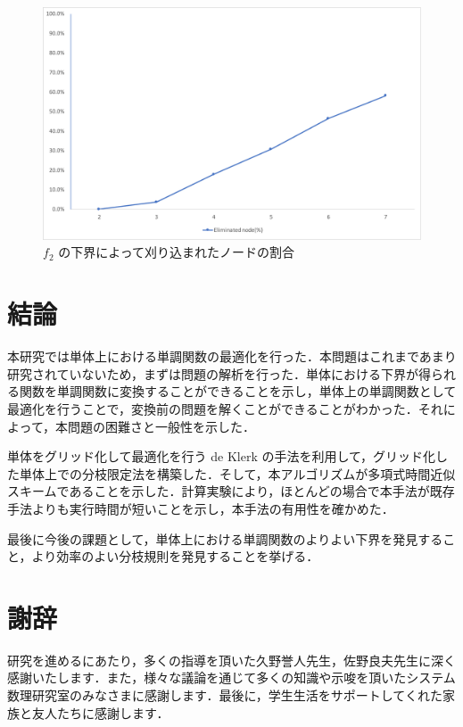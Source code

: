 \documentclass[a4paper,11pt]{jreport}
\begin{document}
\begin{figure}[h]
\begin{center}
\includegraphics[width=13.5cm]{graphs/f_2_eliminated.pdf}
\caption{$ f_2 $ の下界によって刈り込まれたノードの割合}
\label{fig:f_2_eliminated}
\end{center}
\end{figure}

\chapter{結論}

本研究では単体上における単調関数の最適化を行った．本問題はこれまであまり研究されていないため，まずは問題の解析を行った．単体における下界が得られる関数を単調関数に変換することができることを示し，単体上の単調関数として最適化を行うことで，変換前の問題を解くことができることがわかった．それによって，本問題の困難さと一般性を示した．\par
単体をグリッド化して最適化を行う de Klerk の手法を利用して，グリッド化した単体上での分枝限定法を構築した．そして，本アルゴリズムが多項式時間近似スキームであることを示した．計算実験により，ほとんどの場合で本手法が既存手法よりも実行時間が短いことを示し，本手法の有用性を確かめた．\par
最後に今後の課題として，単体上における単調関数のよりよい下界を発見すること，より効率のよい分枝規則を発見することを挙げる．\par

\chapter*{謝辞}

研究を進めるにあたり，多くの指導を頂いた久野誉人先生，佐野良夫先生に深く感謝いたします．また，様々な議論を通じて多くの知識や示唆を頂いたシステム数理研究室のみなさまに感謝します．最後に，学生生活をサポートしてくれた家族と友人たちに感謝します．
\end{document}
